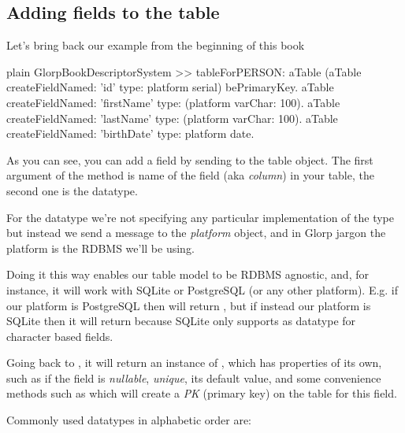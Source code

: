 \documentclass[10pt,twoside,english]{_support/latex/sbabook/sbabook}
\begin{document}
\subsection{Adding fields to the table}
Let's bring back our example from the beginning of this book

\begin{displaycode}{plain}
GlorpBookDescriptorSystem >> tableForPERSON: aTable
	(aTable createFieldNamed: 'id' type: platform serial) bePrimaryKey.
	aTable createFieldNamed: 'firstName' type: (platform varChar: 100).
	aTable createFieldNamed: 'lastName' type: (platform varChar: 100).
	aTable createFieldNamed: 'birthDate' type: platform date.
\end{displaycode}

As you can see, you can add a field by sending  to
the table object. The first argument of the method is name of the field
(aka \textit{column}) in your table, the second one is the datatype.

For the datatype we're not specifying any particular implementation of the type
but instead we send a message to the \textit{platform} object, and in Glorp jargon
the platform is the RDBMS we'll be using.

Doing it this way enables our table model to be RDBMS agnostic, and, for instance,
it will work with SQLite or PostgreSQL (or any other platform).
E.g. if our platform is PostgreSQL then  will return
, but if instead our platform is SQLite then it will return 
because SQLite only supports  as datatype for character based fields.

Going back to , it will return an instance of
, which has properties of its own, such as if the field is
\textit{nullable}, \textit{unique}, its default value, and some convenience methods such
as  which will create a \textit{PK} (primary key) on the table
for this field.

Commonly used datatypes in alphabetic order are: 
\end{document}
